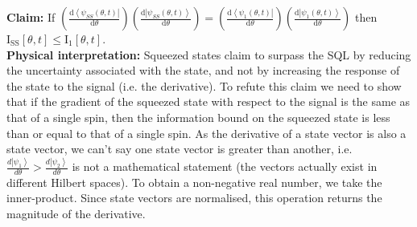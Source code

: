 \documentclass[reqno]{amsart}
\newcommand{\ket}[1]{\left| #1 \right>}
\newcommand{\bra}[1]{\left< #1 \right|}
\def\funcwrt#1#2#3{\mathrm{#1}_{\mathrm{#3}}\left[#2\right]}
\begin{document}
\textbf{Claim:} If $\left(\frac{\mathrm{d}\bra{\psi_{SS}(\theta,t)}}{\mathrm{d} \theta}\right)\left(\frac{\mathrm{d}\ket{\psi_{SS}(\theta,t)}}{\mathrm{d} \theta}\right) = \left(\frac{\mathrm{d}\bra{\psi_1(\theta,t)}}{\mathrm{d} \theta}\right)\left(\frac{\mathrm{d}\ket{\psi_1(\theta,t)}}{\mathrm{d} \theta}\right)$ then $\funcwrt{I}{\theta,t}{SS} \leq \funcwrt{I}{\theta,t}{1}$.\\

\textbf{Physical interpretation:} Squeezed states claim to surpass the SQL by reducing the uncertainty associated with the state, and not by increasing the response of the state to the signal (i.e. the derivative). To refute this claim we need to show that if the gradient of the squeezed state with respect to the signal is the same as that of a single spin, then the information bound on the squeezed state is less than or equal to that of a single spin. As the derivative of a state vector is also a state vector, we can't say one state vector is greater than another, i.e. $\frac{d\ket{\psi_1}}{d\theta} > \frac{d\ket{\psi_2}}{d\theta}$ is not a mathematical statement (the vectors actually exist in different Hilbert spaces). To obtain a non-negative real number, we take the inner-product. Since state vectors are normalised, this operation returns the magnitude of the derivative.\\
\end{document}
